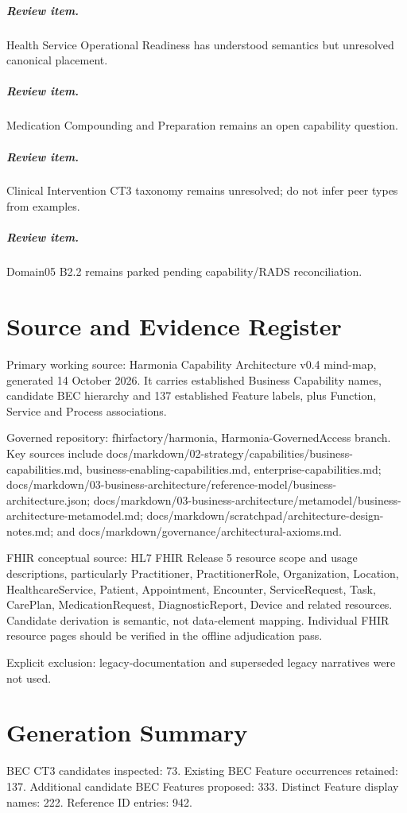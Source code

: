 \documentclass[11pt,a4paper,openany]{book}
\begin{document}
\paragraph{Review item.} Health Service Operational Readiness has understood semantics but unresolved canonical placement.\par
\paragraph{Review item.} Medication Compounding and Preparation remains an open capability question.\par
\paragraph{Review item.} Clinical Intervention CT3 taxonomy remains unresolved; do not infer peer types from examples.\par
\paragraph{Review item.} Domain05 B2.2 remains parked pending capability/RADS reconciliation.\par
\chapter{Source and Evidence Register}
Primary working source: Harmonia Capability Architecture v0.4 mind-map, generated 14 October 2026. It carries established Business Capability names, candidate BEC hierarchy and 137 established Feature labels, plus Function, Service and Process associations.

Governed repository: fhirfactory/harmonia, Harmonia-GovernedAccess branch. Key sources include docs/markdown/02-strategy/capabilities/business-capabilities.md, business-enabling-capabilities.md, enterprise-capabilities.md; docs/markdown/03-business-architecture/reference-model/business-architecture.json; docs/markdown/03-business-architecture/metamodel/business-architecture-metamodel.md; docs/markdown/scratchpad/architecture-design-notes.md; and docs/markdown/governance/architectural-axioms.md.

FHIR conceptual source: HL7 FHIR Release 5 resource scope and usage descriptions, particularly Practitioner, PractitionerRole, Organization, Location, HealthcareService, Patient, Appointment, Encounter, ServiceRequest, Task, CarePlan, MedicationRequest, DiagnosticReport, Device and related resources. Candidate derivation is semantic, not data-element mapping. Individual FHIR resource pages should be verified in the offline adjudication pass.

Explicit exclusion: legacy-documentation and superseded legacy narratives were not used.

\chapter{Generation Summary}
BEC CT3 candidates inspected: 73. Existing BEC Feature occurrences retained: 137. Additional candidate BEC Features proposed: 333. Distinct Feature display names: 222. Reference ID entries: 942.

\backmatter\printindex
\end{document}
